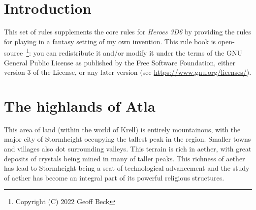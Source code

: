 \documentclass[a4paper,11pt,oneside]{book}
\newcommand{\textlf}[1]{\textbf{\titlecap{#1}}}
\begin{document}
%
\chapter{Introduction}
This set of rules supplements the core rules for \textit{Heroes 3D6} by providing the rules for playing in a fantasy setting of my own invention. This rule book is open-source~\footnote{Copyright (C) 2022  Geoff Beck}: you can redistribute it and/or modify
it under the terms of the GNU General Public License as published by
the Free Software Foundation, either version 3 of the License, or any later version (see \url{https://www.gnu.org/licenses/}).


\chapter{The highlands of Atla}
This area of land (within the world of Krell) is entirely mountainous, with the major city of Stormheight occupying the tallest peak in the region. Smaller towns and villages also dot surrounding valleys. This terrain is rich in aether, with great deposits of crystals being mined in many of taller peaks. This richness of aether has lead to Stormheight being a seat of technological advancement and the study of aether has become an integral part of its powerful religious structures.  
\end{document}
